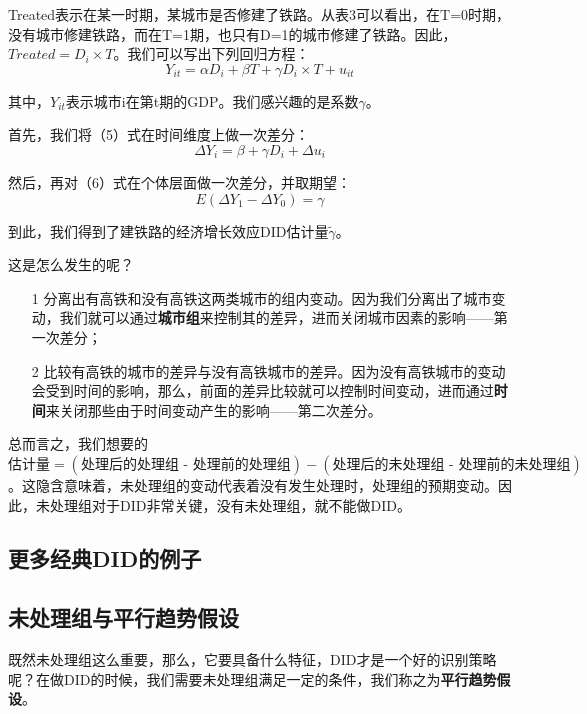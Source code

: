 \documentclass[cn,12pt,math=newtx,citestyle=gb7714-2015,bibstyle=gb7714-2015]{elegantbook}
\begin{document}
	Treated表示在某一时期，某城市是否修建了铁路。从表3可以看出，在T=0时期，没有城市修建铁路，而在T=1期，也只有D=1的城市修建了铁路。因此，$Treated=D_i\times{T}$。我们可以写出下列回归方程：
	\begin{equation}
		Y_{it}=\alpha{D}_i+\beta{T}+\gamma{D_i\times{T}}+u_{it}
	\end{equation}
	
	其中，$Y_{it}$表示城市i在第t期的GDP。我们感兴趣的是系数$\gamma$。
	
	首先，我们将（5）式在时间维度上做一次差分：
	\begin{equation}
		\Delta{Y}_i=\beta+\gamma{D}_i+\Delta{u}_i
	\end{equation}
	
	然后，再对（6）式在个体层面做一次差分，并取期望：
	\begin{equation}
		E(\Delta{Y}_1-\Delta{Y}_0)=\gamma
	\end{equation}
	
	到此，我们得到了建铁路的经济增长效应DID估计量$\tilde{\gamma}$。
	
	这是怎么发生的呢？
	
	\begin{itemize}
		\item [1] 分离出有高铁和没有高铁这两类城市的组内变动。因为我们分离出了城市变动，我们就可以通过\textbf{城市组}来控制其的差异，进而关闭城市因素的影响——第一次差分；
		\item [2] 比较有高铁的城市的差异与没有高铁城市的差异。因为没有高铁城市的变动会受到时间的影响，那么，前面的差异比较就可以控制时间变动，进而通过\textbf{时间}来关闭那些由于时间变动产生的影响——第二次差分。
	\end{itemize}

    总而言之，我们想要的$\text{估计量} = (\text{处理后的处理组 - 处理前的处理组}) - (\text{处理后的未处理组 - 处理前的未处理组})$。这隐含意味着，未处理组的变动代表着没有发生处理时，处理组的预期变动。因此，未处理组对于DID非常关键，没有未处理组，就不能做DID。
	
	
	\subsection{更多经典DID的例子}
	
	
	
	\subsection{未处理组与平行趋势假设}
	
	既然未处理组这么重要，那么，它要具备什么特征，DID才是一个好的识别策略呢？在做DID的时候，我们需要未处理组满足一定的条件，我们称之为\textbf{平行趋势假设}。
	
\end{document}
